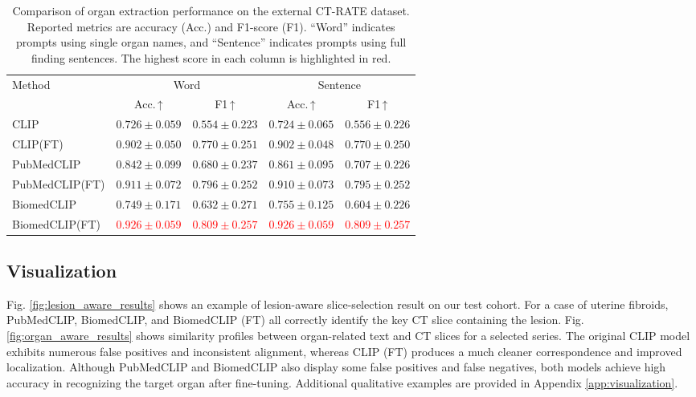 \documentclass[bioengineering,article,submit,pdftex,moreauthors]{Definitions/mdpi}
\begin{document}
\begin{table}[ht]
  \centering
  \caption{Comparison of organ extraction performance on the external CT-RATE dataset. 
  Reported metrics are accuracy (Acc.) and F1-score (F1). 
  “Word” indicates prompts using single organ names, and “Sentence” indicates prompts using full finding sentences. 
  The highest score in each column is highlighted in red.}
  \label{tab:organ_extraction_results_ctrate}
  \begin{tabular}{lcccc}
    \toprule
    \multirow{2}{*}{Method} & \multicolumn{2}{c}{Word}               & \multicolumn{2}{c}{Sentence}           \\
    \cmidrule(lr){2-3}\cmidrule(lr){4-5}
                           & Acc.\,↑ & F1\,↑         & Acc.\,↑   & F1\,↑         \\ 
    \midrule
    CLIP                    & $0.726\pm0.059$ & $0.554\pm0.223$ & $0.724\pm0.065$ & $0.556\pm0.226$ \\
    CLIP(FT)                & $0.902\pm0.050$ & $0.770\pm0.251$ & $0.902\pm0.048$ & $0.770\pm0.250$ \\
    PubMedCLIP              & $0.842\pm0.099$ & $0.680\pm0.237$ & $0.861\pm0.095$ & $0.707\pm0.226$ \\
    PubMedCLIP(FT)          & $0.911\pm0.072$ & $0.796\pm0.252$ & $0.910\pm0.073$ & $0.795\pm0.252$ \\
    BiomedCLIP              & $0.749\pm0.171$ & $0.632\pm0.271$ & $0.755\pm0.125$ & $0.604\pm0.226$ \\
    BiomedCLIP(FT)          & \textcolor{red}{$0.926\pm0.059$} & \textcolor{red}{$0.809\pm0.257$} & \textcolor{red}{$0.926\pm0.059$} & \textcolor{red}{$0.809\pm0.257$} \\
    \bottomrule
  \end{tabular}
\end{table}


\subsection{Visualization}\label{sec:visualization}
Fig. \ref{fig:lesion_aware_results} shows an example of lesion-aware slice-selection result on our test cohort. 
For a case of uterine fibroids, PubMedCLIP, BiomedCLIP, and BiomedCLIP (FT) all correctly identify the key CT slice containing the lesion.
Fig. \ref{fig:organ_aware_results} shows similarity profiles between organ-related text and CT slices for a selected series. 
The original CLIP model exhibits numerous false positives and inconsistent alignment, whereas CLIP (FT) produces a much cleaner correspondence and improved localization. 
Although PubMedCLIP and BiomedCLIP also display some false positives and false negatives, both models achieve high accuracy in recognizing the target organ after fine-tuning. 
Additional qualitative examples are provided in Appendix \ref{app:visualization}.
\end{document}
